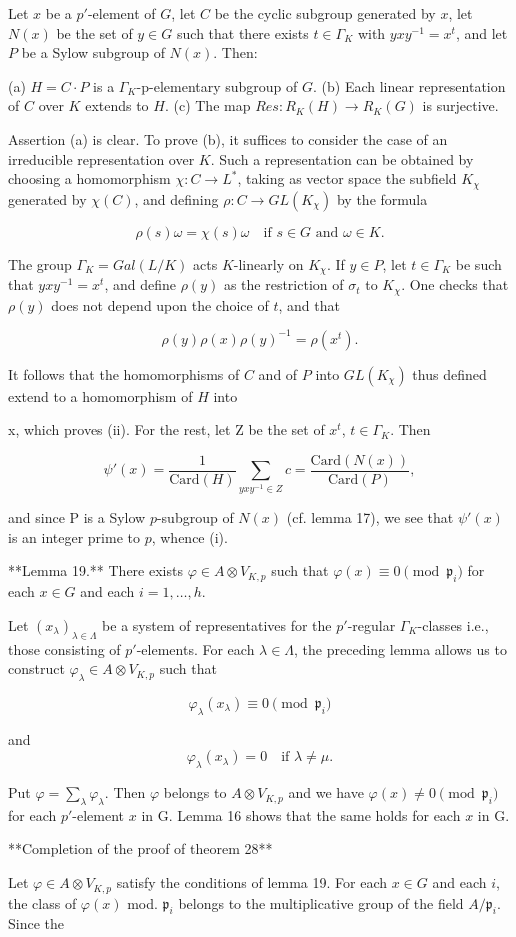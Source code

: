 Let $x$ be a $p'$-element of $G$, let $C$ be the cyclic subgroup generated by $x$, let $N(x)$ be the set of $y \in G$ such that there exists $t \in \Gamma_K$ with $yxy^{-1} = x^t$, and let $P$ be a Sylow subgroup of $N(x)$. Then:

(a) $H = C \cdot P$ is a $\Gamma_K$-p-elementary subgroup of $G$.
(b) Each linear representation of $C$ over $K$ extends to $H$.
(c) The map $Res: R_K(H) \rightarrow R_K(G)$ is surjective.

Assertion (a) is clear. To prove (b), it suffices to consider the case of an irreducible representation over $K$. Such a representation can be obtained by choosing a homomorphism $\chi: C \rightarrow L^*$, taking as vector space the subfield $K_\chi$ generated by $\chi(C)$, and defining $\rho: C \rightarrow GL(K_\chi)$ by the formula

$$\rho(s)\omega = \chi(s)\omega \quad \text{if } s \in G \text{ and } \omega \in K.$$

The group $\Gamma_K = Gal(L/K)$ acts $K$-linearly on $K_\chi$. If $y \in P$, let $t \in \Gamma_K$ be such that $yxy^{-1} = x^t$, and define $\rho(y)$ as the restriction of $\sigma_t$ to $K_\chi$. One checks that $\rho(y)$ does not depend upon the choice of $t$, and that

$$\rho(y)\rho(x)\rho(y)^{-1} = \rho(x^t).$$

It follows that the homomorphisms of $C$ and of $P$ into $GL(K_\chi)$ thus defined extend to a homomorphism of $H$ into

x, which proves (ii). For the rest, let Z be the set of $x^t$, $t \in \Gamma_K$. Then

$$\psi'(x) = \frac{1}{\text{Card}(H)} \sum_{yxy^{-1} \in Z} c = \frac{\text{Card}(N(x))}{\text{Card}(P)},$$

and since P is a Sylow $p$-subgroup of $N(x)$ (cf. lemma 17), we see that $\psi'(x)$ is an integer prime to $p$, whence (i).

**Lemma 19.** There exists $\varphi \in A \otimes V_{K,p}$ such that $\varphi(x) \equiv 0 \pmod{\mathfrak{p}_i}$ for each $x \in G$ and each $i = 1, \ldots, h$.

Let $(x_\lambda)_{\lambda \in \Lambda}$ be a system of representatives for the $p'$-regular $\Gamma_K$-classes i.e., those consisting of $p'$-elements. For each $\lambda \in \Lambda$, the preceding lemma allows us to construct $\varphi_\lambda \in A \otimes V_{K,p}$ such that

$$\varphi_\lambda(x_\lambda) \equiv 0 \pmod{\mathfrak{p}_i}$$

and $$\varphi_\lambda(x_\lambda) = 0 \quad \text{if } \lambda \neq \mu.$$

Put $\varphi = \sum_\lambda \varphi_\lambda$. Then $\varphi$ belongs to $A \otimes V_{K,p}$ and we have $\varphi(x) \neq 0 \pmod{\mathfrak{p}_i}$ for each $p'$-element $x$ in G. Lemma 16 shows that the same holds for each $x$ in G.

**Completion of the proof of theorem 28**

Let $\varphi \in A \otimes V_{K,p}$ satisfy the conditions of lemma 19. For each $x \in G$ and each $i$, the class of $\varphi(x)$ mod. $\mathfrak{p}_i$ belongs to the multiplicative group of the field $A/\mathfrak{p}_i$. Since the
